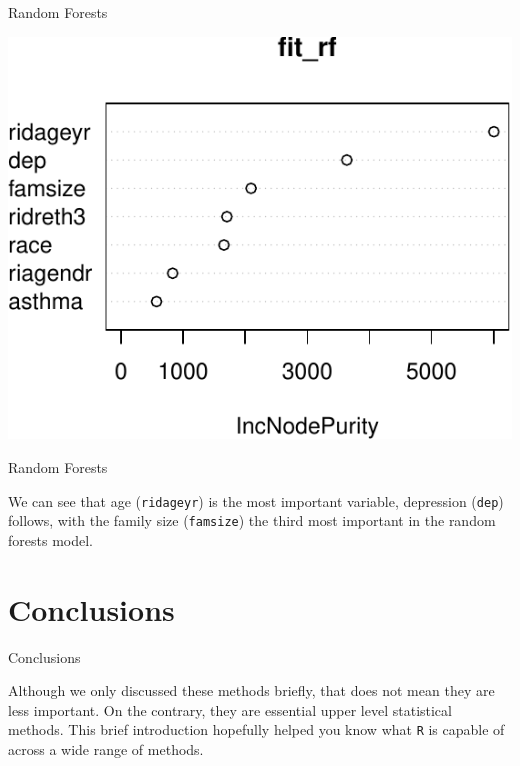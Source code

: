 \begin{frame}{Random Forests}

\includegraphics{07_OtherModels_files/figure-beamer/unnamed-chunk-21-1.pdf}

\end{frame}

\begin{frame}[fragile]{Random Forests}

We can see that age (\texttt{ridageyr}) is the most important variable,
depression (\texttt{dep}) follows, with the family size
(\texttt{famsize}) the third most important in the random forests model.

\end{frame}

\section{Conclusions}\label{conclusions}

\begin{frame}[fragile]{Conclusions}

Although we only discussed these methods briefly, that does not mean
they are less important. On the contrary, they are essential upper level
statistical methods. This brief introduction hopefully helped you know
what \texttt{R} is capable of across a wide range of methods.

\end{frame}
